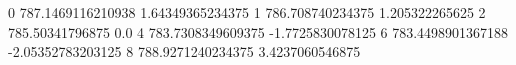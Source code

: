 0 787.1469116210938 1.64349365234375
1 786.708740234375 1.205322265625
2 785.50341796875 0.0
4 783.7308349609375 -1.7725830078125
6 783.4498901367188 -2.05352783203125
8 788.9271240234375 3.4237060546875
